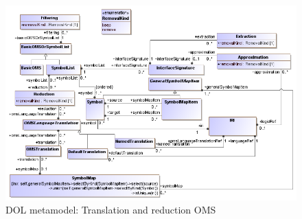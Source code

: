 \documentclass[10pt, a4paper]{isov2}
\makeatletter
\newcommand*\CommentAuthor{}
\renewcommand*\CommentAuthor{#1}}
\newcommand*\CommentDate{}
\renewcommand*\CommentDate{#1}}
\newcommand*\CommentId{}
\renewcommand*\CommentId{#1}}
\newcommand*\CommentType{}
\renewcommand*\CommentType{#1}}
\newcommand*{\SetCommentColorByType}[1]{%
\edef\localType{{#1}}%
\expandafter\ifstrequal\localType{q-aut}{\colorlet{CommentColor}{red}}{%
\expandafter\ifstrequal\localType{q-all}{\colorlet{CommentColor}{orange}}{%
\expandafter\ifstrequal\localType{todo}{\colorlet{CommentColor}{orange}}{%
\expandafter\ifstrequal\localType{fyi}{\colorlet{CommentColor}{lightgray}}{%
\colorlet{CommentColor}{yellow}}}}}}
\newcommand*{\SetCommentPrefixByType}[1]{%
\edef\localType{{#1}}%
\expandafter\@ifmtarg\localType{%
\edef\CommentPrefix{}%
}{%
\caseupper[q]{#1}%
\edef\CommentPrefix{\thestring: }%
}}
\newcommand*{\initComment}[1]{%
\setkeys{Comment}{#1}%
\SetCommentColorByType{\CommentType}%
\relax%
\SetCommentPrefixByType{\CommentType}%
\relax%
}
\newcommand*{\todonote}[2][]{%
\initComment{#1}%
\pdfcomment[author=\CommentAuthor,color=CommentColor,date=\CommentDate,id=\CommentId]{%
\CommentPrefix
#2}}
\renewcommand*{\todonote}[2][]{%
\initComment{#1}%
\ednote{\CommentPrefix #2}}
\newcommand*{\CLnote}[2][author=Christoph Lange]{%
\todonote[author=Christoph Lange,#1]{#2}}
\makeatother
\begin{document}
\medskip
\begin{figure}
  \centering
    \includegraphics[scale=0.47]{mof/translation&reduction.png}
  \caption{DOL metamodel: Translation and reduction OMS}
  \label{fig:translations&reduction}
\end{figure}



 \label{a:dol-text:OMS}
\end{document}
